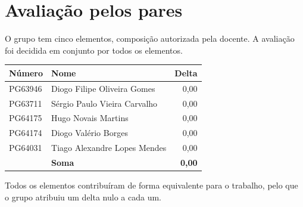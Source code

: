 \section{Avaliação pelos pares}\label{app:pares}

O grupo tem cinco elementos, composição autorizada pela docente.
A avaliação foi decidida em conjunto por todos os elementos.

\begin{center}
\begin{tabular}{llr}
\toprule
Número & Nome & Delta \\
\midrule
PG63946 & Diogo Filipe Oliveira Gomes & 0,00 \\
PG63711 & Sérgio Paulo Vieira Carvalho & 0,00 \\
PG64175 & Hugo Novais Martins & 0,00 \\
PG64174 & Diogo Valério Borges & 0,00 \\
PG64031 & Tiago Alexandre Lopes Mendes & 0,00 \\
\midrule
 & \textbf{Soma} & \textbf{0,00} \\
\bottomrule
\end{tabular}
\end{center}
Todos os elementos contribuíram de forma equivalente para o trabalho, pelo que o grupo atribuiu
um delta nulo a cada um.
